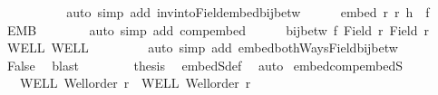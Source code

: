 \begin{isabellebody}
\ {}\ \isanewline
\ \ \ \ \ \ \isamarkupfalse%
\ {\isacharparenleft}{\kern0pt}auto\ simp\ add{\isacharcolon}{\kern0pt}\ inv{\isacharunderscore}{\kern0pt}into{\isacharunderscore}{\kern0pt}Field{\isacharunderscore}{\kern0pt}embed{\isacharunderscore}{\kern0pt}bij{\isacharunderscore}{\kern0pt}betw{\isacharparenright}{\kern0pt}\isanewline
\ \ \ \ \isamarkupfalse%
\ {\isachardoublequoteopen}embed\ r{\isacharprime}{\kern0pt}\ r\ {\isacharparenleft}{\kern0pt}{\isacharquery}{\kern0pt}h\ {\isasymcirc}\ f{\isacharprime}{\kern0pt}{\isacharparenright}{\kern0pt}{\isachardoublequoteclose}\ \isamarkupfalse%
\ EMB{\isacharprime}{\kern0pt}\isanewline
\ \ \ \ \ \ \isamarkupfalse%
\ {\isacharparenleft}{\kern0pt}auto\ simp\ add{\isacharcolon}{\kern0pt}\ comp{\isacharunderscore}{\kern0pt}embed{\isacharparenright}{\kern0pt}\isanewline
\ \ \ \ \isamarkupfalse%
\ {\isachardoublequoteopen}bij{\isacharunderscore}{\kern0pt}betw\ f\ {\isacharparenleft}{\kern0pt}Field\ r{\isacharparenright}{\kern0pt}\ {\isacharparenleft}{\kern0pt}Field\ r{\isacharprime}{\kern0pt}{\isacharparenright}{\kern0pt}{\isachardoublequoteclose}\ \isamarkupfalse%
\ WELL\ WELL{\isacharprime}{\kern0pt}\ {}\isanewline
\ \ \ \ \ \ \isamarkupfalse%
\ {\isacharparenleft}{\kern0pt}auto\ simp\ add{\isacharcolon}{\kern0pt}\ embed{\isacharunderscore}{\kern0pt}bothWays{\isacharunderscore}{\kern0pt}Field{\isacharunderscore}{\kern0pt}bij{\isacharunderscore}{\kern0pt}betw{\isacharparenright}{\kern0pt}\isanewline
\ \ \ \ \isamarkupfalse%
\ {}\ \isamarkupfalse%
\ False\ \isamarkupfalse%
\ blast\isanewline
\ \ \isacommand{{\isacharbraceright}{\kern0pt}}\isamarkupfalse%
\isanewline
\ \ \isamarkupfalse%
\ \isamarkupfalse%
\ {\isacharquery}{\kern0pt}thesis\ \isamarkupfalse%
\ embedS{\isacharunderscore}{\kern0pt}def\ \isamarkupfalse%
\ auto\isanewline
{}\isamarkupfalse%
%
\endisatagproof
{\isafoldproof}%
%
\isadelimproof
\isanewline
%
\endisadelimproof
\isanewline
{}\isamarkupfalse%
\ embed{\isacharunderscore}{\kern0pt}comp{\isacharunderscore}{\kern0pt}embedS{\isacharcolon}{\kern0pt}\isanewline
\ \ \ WELL{\isacharcolon}{\kern0pt}\ {\isachardoublequoteopen}Well{\isacharunderscore}{\kern0pt}order\ r{\isachardoublequoteclose}\ \ WELL{\isacharprime}{\kern0pt}{\isacharcolon}{\kern0pt}\ {\isachardoublequoteopen}Well{\isacharunderscore}{\kern0pt}order\ r{\isacharprime}{\kern0pt}{\isachardoublequoteclose}\ \isanewline

\end{isabellebody}
